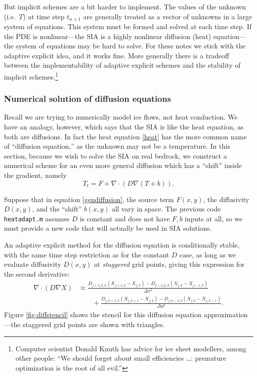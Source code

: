 \documentclass[titlepage,letterpaper,final,12pt]{scrartcl}
\newcommand{\grad}{\nabla}
\newcommand{\Div}{\nabla\cdot}
\begin{document}
But implicit schemes are a bit harder to implement.  The values of the unknown (i.e.~$T$) at time step $t_{n+1}$ are generally treated as a vector of unknowns in a large system of equations.  This system must be formed and solved at each time step.  If the PDE is nonlinear---the SIA is a highly nonlinear diffusion (heat) equation---the system of equations may be hard to solve.  For these notes we stick with the adaptive explicit idea, and it works fine.  More generally there is a tradeoff between the implementability of adaptive explicit schemes and the stability of implicit schemes.\footnote{Computer scientist Donald Knuth has advice for ice sheet modellers, among other people: ``We should forget about small efficiencies \dots: premature optimization is the root of all evil.''}

\subsubsection*{Numerical solution of diffusion equations}  Recall we are trying to numerically model ice flows, not heat conduction.  We have an analogy, however, which says that the SIA is like the heat equation, as both are diffusions.  In fact the heat equation \eqref{heat} has the more common name of ``diffusion equation,'' as the unknown may not be a temperature.  In this section, because we wish to solve the SIA on real bedrock, we construct a numerical scheme for an even more general diffusion which has a ``shift'' inside the gradient, namely
\begin{equation}
  T_t = F + \Div \left(D \grad (T + b)\right). \label{gendiffusion}
\end{equation}

Suppose that in equation \eqref{gendiffusion}, the source term $F(x,y)$, the diffusivity $D(x,y)$, and the ``shift'' $b(x,y)$ all vary in space.  The previous code \texttt{heatadapt.m} assumes $D$ is constant and does not have $F,b$ inputs at all, so we must provide a new code that will actually be used in SIA solutions.

An adaptive explicit method for the diffusion equation is conditionally stable, with the same time step restriction as for the constant $D$ case, as long as we evaluate diffusivity $D(x,y)$ at \emph{staggered} grid points, giving this expression for the second derivative:
\begin{align*}
\Div \left(D \grad X\right) &\approx \frac{D_{j+1/2,k}(X_{j+1,k} - X_{j,k}) - D_{j-1/2,k}(X_{j,k} - X_{j-1,k})}{\Delta x^2} \\
	&\qquad + \frac{D_{j,k+1/2}(X_{j,k+1} - X_{j,k}) - D_{j,k-1/2}(X_{j,k} - X_{j,k-1})}{\Delta y^2}.
\end{align*}
Figure \ref{fig:diffstencil} shows the stencil for this diffusion equation approximation---the staggered grid points are shown with triangles.
\end{document}

